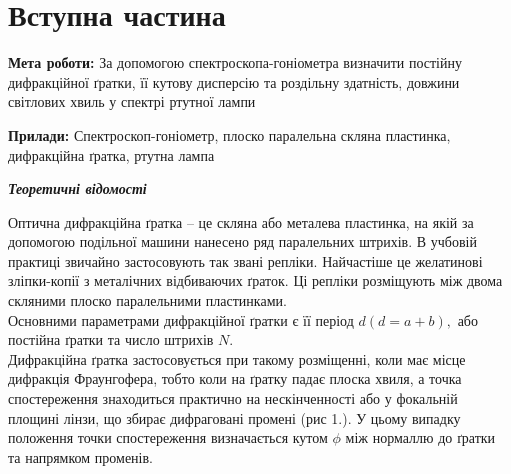 \section{Вступна частина}
\setlength{\parindent}{4em}
\indent \textbf{Мета роботи:} За допомогою спектроскопа-гоніометра визначити постійну дифракційної ґратки,
її кутову дисперсію та роздільну здатність, довжини світлових хвиль у спектрі ртутної лампи \par
\textbf{Прилади:} Спектроскоп-гоніометр, плоско паралельна скляна пластинка, дифракційна ґратка,
ртутна лампа
\begin{center}
\textbf{\emph{Теоретичні відомості}}
\end{center}
\qquad Оптична дифракційна ґратка – це скляна або металева пластинка, на якій за допомогою подільної
машини нанесено ряд паралельних штрихів. В учбовій практиці звичайно застосовують так звані
репліки. Найчастіше це желатинові зліпки-копії з металічних відбиваючих ґраток. Ці репліки
розміщують між двома скляними плоско паралельними пластинками. \\
Основними параметрами дифракційної ґратки є її період $d ( d = a + b),$ або постійна ґратки та
число штрихів $N$. \\
Дифракційна ґратка застосовується при такому розміщенні, коли має місце дифракція
Фраунгофера, тобто коли на ґратку падає плоска хвиля, а точка спостереження знаходиться
практично на нескінченності або у фокальній площині лінзи, що збирає дифраговані промені
(рис 1.). У цьому випадку положення точки спостереження визначається кутом $\phi$ між нормаллю
до ґратки та напрямком променів.

